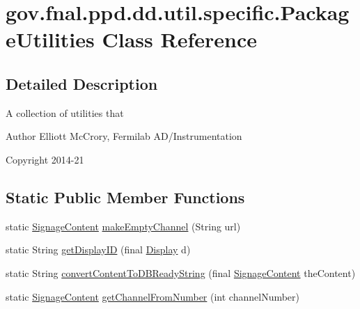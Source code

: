 \hypertarget{classgov_1_1fnal_1_1ppd_1_1dd_1_1util_1_1specific_1_1PackageUtilities}{\section{gov.\-fnal.\-ppd.\-dd.\-util.\-specific.\-Package\-Utilities Class Reference}
\label{classgov_1_1fnal_1_1ppd_1_1dd_1_1util_1_1specific_1_1PackageUtilities}
}


\subsection{Detailed Description}
A collection of utilities that

\begin{DoxyAuthor}{Author}
Elliott Mc\-Crory, Fermilab A\-D/\-Instrumentation 
\end{DoxyAuthor}
\begin{DoxyCopyright}{Copyright}
2014-\/21 
\end{DoxyCopyright}
\subsection*{Static Public Member Functions}
\begin{DoxyCompactItemize}
\item 
static \hyperlink{interfacegov_1_1fnal_1_1ppd_1_1dd_1_1signage_1_1SignageContent}{Signage\-Content} \hyperlink{classgov_1_1fnal_1_1ppd_1_1dd_1_1util_1_1specific_1_1PackageUtilities_a21b0b417b695336725658a6fde76b042}{make\-Empty\-Channel} (String url)
\item 
static String \hyperlink{classgov_1_1fnal_1_1ppd_1_1dd_1_1util_1_1specific_1_1PackageUtilities_ac76f976bf20f252c63f3fe1a5e934d55}{get\-Display\-I\-D} (final \hyperlink{interfacegov_1_1fnal_1_1ppd_1_1dd_1_1signage_1_1Display}{Display} d)
\item 
static String \hyperlink{classgov_1_1fnal_1_1ppd_1_1dd_1_1util_1_1specific_1_1PackageUtilities_a77b0bd55fcfdef42895b14ee8fd86e1b}{convert\-Content\-To\-D\-B\-Ready\-String} (final \hyperlink{interfacegov_1_1fnal_1_1ppd_1_1dd_1_1signage_1_1SignageContent}{Signage\-Content} the\-Content)
\item 
static \hyperlink{interfacegov_1_1fnal_1_1ppd_1_1dd_1_1signage_1_1SignageContent}{Signage\-Content} \hyperlink{classgov_1_1fnal_1_1ppd_1_1dd_1_1util_1_1specific_1_1PackageUtilities_aed411058ce30f98adc137f40cfa053f8}{get\-Channel\-From\-Number} (int channel\-Number)
\end{DoxyCompactItemize}

